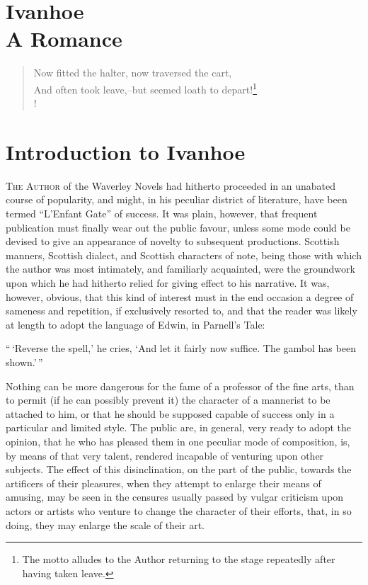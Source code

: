 \chapter*{Ivanhoe\\
    A Romance}

\begin{verse}
Now fitted the halter, now traversed the cart,\\
And often took leave,--but seemed loath to depart!\footnote{The motto
alludes to the Author returning to the stage
repeatedly after having taken leave.}\\!
\end{verse}

\chapter{Introduction to Ivanhoe}

\lettrine{T}{he Author} of the Waverley Novels had hitherto proceeded in
an unabated
course of popularity, and might, in his peculiar district of literature,
have been termed ``L'Enfant Gate'' of success. It was plain, however,
that frequent publication must finally wear out the public favour,
unless some mode could be devised to give an appearance of novelty to
subsequent productions. Scottish manners, Scottish dialect, and Scottish
characters of note, being those with which the author was most
intimately, and familiarly acquainted, were the groundwork upon which he
had hitherto relied for giving effect to his narrative. It was, however,
obvious, that this kind of interest must in the end occasion a degree of
sameness and repetition, if exclusively resorted to, and that the reader
was likely at length to adopt the language of Edwin, in Parnell's Tale:

``\,`Reverse the spell,' he cries, `And let it fairly now suffice. The
gambol has been shown.'\,''

Nothing can be more dangerous for the fame of a professor of the fine
arts, than to permit (if he can possibly prevent it) the character of a
mannerist to be attached to him, or that he should be supposed capable
of success only in a particular and limited style. The public are, in
general, very ready to adopt the opinion, that he who has pleased them
in one peculiar mode of composition, is, by means of that very talent,
rendered incapable of venturing upon other subjects. The effect of this
disinclination, on the part of the public, towards the artificers of
their pleasures, when they attempt to enlarge their means of amusing,
may be seen in the censures usually passed by vulgar criticism upon
actors or artists who venture to change the character of their efforts,
that, in so doing, they may enlarge the scale of their art.

